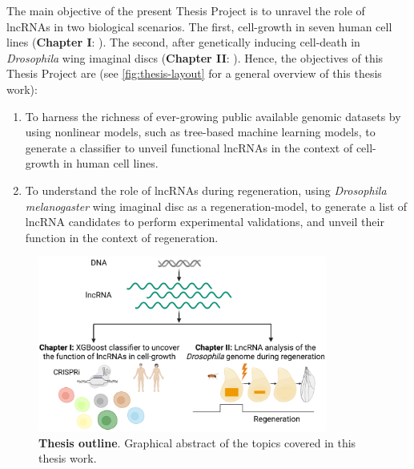 The main objective of the present Thesis Project is to unravel the role of lncRNAs in two biological scenarios. The first, cell-growth in seven human cell lines (\textbf{Chapter I}: ). The second, after genetically inducing cell-death in \textit{Drosophila} wing imaginal discs (\textbf{Chapter II}: ). Hence, the objectives of this Thesis Project are (see \autoref{fig:thesis-layout} for a general overview of this thesis work):

\begin{enumerate}

\item To harness the richness of ever-growing public available genomic datasets by using nonlinear models, such as tree-based machine learning models, to generate a classifier to unveil functional lncRNAs in the context of cell-growth in human cell lines.

\item To understand the role of lncRNAs during regeneration, using \textit{Drosophila melanogaster} wing imaginal disc as a regeneration-model, to generate a list of lncRNA candidates to perform experimental validations, and unveil their function in the context of regeneration.
  
\end{enumerate}

\begin{figure}[!htb]
  \centering
  \includegraphics[width=0.85\textwidth]{img/objectives/objectives.png}
  \caption[Thesis outline]{\textbf{Thesis outline}. Graphical abstract of the topics covered in this thesis work.}
  \label{fig:thesis-layout}
\end{figure}

